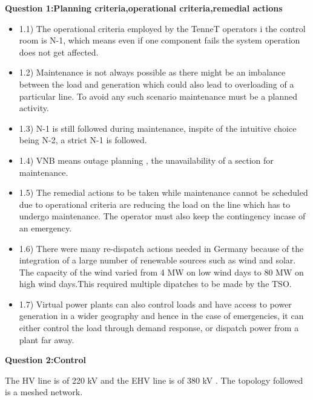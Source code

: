 \justifying
{\textbf{Question 1:Planning criteria,operational criteria,remedial actions}}
    \begin{itemize}
        \item 1.1) The operational criteria employed by the TenneT operators i the control room is N-1, which means even if one component fails the system operation does not get affected.
        \item 1.2) Maintenance is not always possible as there might be an imbalance between the load and generation which could also lead to overloading of a particular line. To avoid any such scenario maintenance must be a planned activity.
        \item 1.3) N-1 is still followed during maintenance, inspite of the intuitive choice being N-2, a strict N-1 is followed.
        \item 1.4) VNB means outage planning , the unavailability of a section for maintenance.
        \item 1.5) The remedial actions to be taken while maintenance cannot be scheduled due to operational criteria are reducing the load on the line which has to undergo maintenance. The operator must also keep the contingency incase of an emergency.
        \item 1.6) There were many re-dispatch actions needed in Germany because of the integration of a large number of renewable sources such as wind and solar. The capacity of the wind varied from 4 MW on low wind days to 80 MW on high wind days.This required multiple dipatches to be made by the TSO.
        \item 1.7) Virtual power plants can also control loads and have access to power generation in a wider geography and hence in the case of emergencies, it can either control the load through demand response, or dispatch power from a plant far away.
        
        \end{itemize}

{\textbf{Question 2:Control}}
 \item The HV line is of 220 kV and the EHV line is of 380 kV . The topology followed is a meshed network.\\
 
